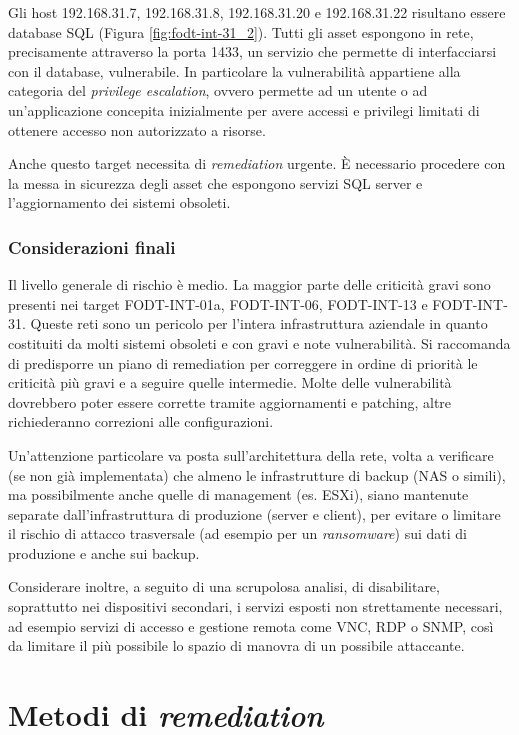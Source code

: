\documentclass[target=bach,aauheader=]{thud}
\begin{document}
Gli host 192.168.31.7, 192.168.31.8, 192.168.31.20 e 192.168.31.22 risultano essere database SQL (Figura \ref{fig:fodt-int-31_2}). Tutti gli asset espongono in rete, precisamente attraverso la porta 1433, un servizio che permette di interfacciarsi con il database, vulnerabile. In particolare la vulnerabilità appartiene alla categoria del \textit{privilege escalation}, ovvero permette ad un utente o ad un'applicazione concepita inizialmente per avere accessi e privilegi limitati di ottenere accesso non autorizzato a risorse.

Anche questo target necessita di \textit{remediation} urgente. È necessario procedere con la messa in sicurezza degli asset che espongono servizi SQL server e l'aggiornamento dei sistemi obsoleti.

\subsection{Considerazioni finali}
Il livello generale di rischio è medio. La maggior parte delle criticità gravi sono presenti nei target FODT-INT-01a, FODT-INT-06, FODT-INT-13 e FODT-INT-31. Queste reti sono un pericolo per l’intera infrastruttura aziendale in quanto costituiti da molti sistemi obsoleti e con gravi e note vulnerabilità. Si raccomanda di predisporre un piano di remediation per correggere in ordine di priorità le criticità più gravi e a seguire quelle intermedie. Molte delle vulnerabilità dovrebbero poter essere corrette tramite aggiornamenti e patching, altre richiederanno correzioni alle configurazioni.

Un’attenzione particolare va posta sull’architettura della rete, volta a verificare (se non già implementata) che almeno le infrastrutture di backup (NAS o simili), ma possibilmente anche quelle di management (es. ESXi), siano mantenute separate dall’infrastruttura di produzione (server e client), per evitare o limitare il rischio di attacco trasversale (ad esempio per un \textit{ransomware}) sui dati di produzione e anche sui backup.

Considerare inoltre, a seguito di una scrupolosa analisi, di disabilitare, soprattutto nei dispositivi secondari, i servizi esposti non strettamente necessari, ad esempio servizi di accesso e gestione remota come VNC, RDP o SNMP, così da limitare il più possibile lo spazio di manovra di un possibile attaccante.


\chapter{Metodi di \textit{remediation}} \label{cap:part-3}
\end{document}
